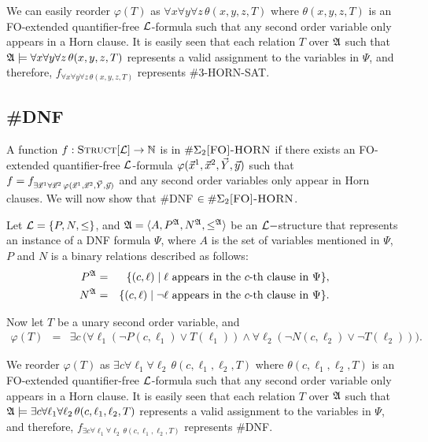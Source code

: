 We can easily reorder $\varphi(T)$ as $\forall x \forall y \forall z\,\theta(x,y,z,T)$ where $\theta(x,y,z,T)$ is an {\sc FO}-extended quantifier-free ${\cal L}$-formula such that any second order variable only appears in a Horn clause. It is easily seen that each relation $T$ over ${\frak A}$ such that ${\frak A}\models\forall x \forall y \forall z\,\theta(x,y,z,T)$ represents a valid assignment to the variables in $\Psi$, and therefore, $f_{\forall x \forall y \forall z\,\theta(x,y,z,T)}$ represents {\sc \#3-HORN-SAT}.

\subsection{{\sc \#DNF}}
A function $f:\textsc{Struct}[{\cal L}] \to \mathbb{N}$ is in $\#\Sigma_2\textsc{[FO]-HORN}$ if there exists an {\sc FO}-extended quantifier-free ${\cal L}$-formula $\varphi(\vec{x}^1,\vec{x}^2,\vec{Y},\vec{y})$ such that $f = f_{\exists\vec{x}^1\forall \vec{x}^2\,\varphi(\vec{x}^1,\vec{x}^2,\vec{Y},\vec{y})}$ and any second order variables only appear in Horn clauses. We will now show that {\sc \#DNF} $\in\#\Sigma_2\textsc{[FO]-HORN}$.

Let ${\cal L} = \{P,N,\leq\}$, and ${\frak A} = \langle A, P^{\frak A}, N^{\frak A}, \leq^{\frak A} \rangle$ be an ${\cal L}-$structure that represents an instance of a {\sc DNF} formula $\Psi$, where $A$ is the set of variables mentioned in $\Psi$, $P$ and $N$ is a binary relations described as follows:
\begin{eqnarray*}
P^{\frak A} &=& \{(c,\ell)\mid \ell \mbox{ appears in the $c$-th clause in }\Psi\},\\
N^{\frak A} &=& \{(c,\ell)\mid \neg \ell \mbox{ appears in the $c$-th clause in }\Psi\}.
\end{eqnarray*}

Now let $T$ be a unary second order variable, and
\begin{eqnarray*}
\varphi(T) &=& \exists c \,\Big(\forall \ell_1 (\neg P(c,\ell_1) \vee T(\ell_1)) \wedge \forall \ell_2 (\neg N(c,\ell_2) \vee \neg T(\ell_2))\Big). 
\end{eqnarray*}

We reorder $\varphi(T)$ as $\exists c \forall \ell_1 \forall \ell_2\, \theta(c,\ell_1,\ell_2,T)$ where $\theta(c,\ell_1,\ell_2,T)$ is an {\sc FO}-extended quantifier-free ${\cal L}$-formula such that any second order variable only appears in a Horn clause. It is easily seen that each relation $T$ over ${\frak A}$ such that ${\frak A}\models \exists c \forall \ell_1 \forall \ell_2\, \theta(c,\ell_1,\ell_2,T)$ represents a valid assignment to the variables in $\Psi$, and therefore, $f_{\exists c \forall \ell_1 \forall \ell_2\, \theta(c,\ell_1,\ell_2,T)}$ represents {\sc \#DNF}.

